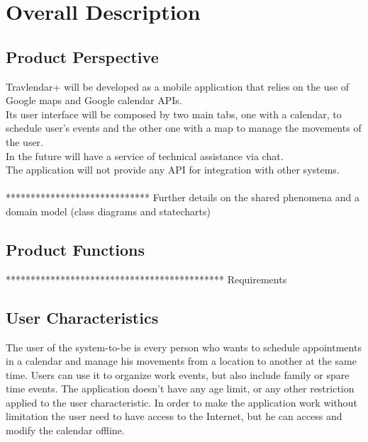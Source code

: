 %
%
\chapter{Overall Description}
%
\label{cap:overalldescription}
%
%
\section{Product Perspective}
Travlendar+ will be developed as a mobile application that relies on the use of Google maps and Google calendar APIs. \\
Its user interface will be composed by two main tabs, one with a calendar, to schedule user's events and the other one with a map to manage the movements of the user. \\
In the future will have a service of technical assistance via chat. \\
The application will not provide any API for integration with other systems.
\\
\\
***************************** Further details on the shared phenomena and a domain model (class diagrams and statecharts)
%
%
\section{Product Functions}
******************************************** Requirements
%
%
\section{User Characteristics}
The user of the system-to-be is every person who wants to schedule appointments in a calendar and manage his movements from a location to another at the same time.
Users can use it to organize work events, but also include family or spare time events. The application doesn't have any age limit, or any other restriction applied to the user characteristic. In order to make the application work without limitation the user need to have access to the Internet, but he can access and modify the calendar offline.
%
%
